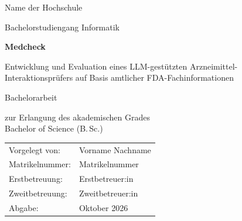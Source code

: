 \documentclass[
  11pt,
  a4paper,
  oneside,
  parskip=half,
  bibliography=totoc,
  listof=totoc,
  numbers=noenddot
]{scrreprt}
\newcommand{\arbeitstitel}{Medcheck}
\newcommand{\arbeitsuntertitel}{Entwicklung und Evaluation eines LLM-gestützten Arzneimittel-Interaktionsprüfers auf Basis amtlicher FDA-Fachinformationen}
\newcommand{\autor}{Vorname Nachname}
\newcommand{\matrikel}{Matrikelnummer}
\newcommand{\hochschule}{Name der Hochschule}
\newcommand{\studiengang}{Bachelorstudiengang Informatik}
\newcommand{\erstbetreuer}{Erstbetreuer:in}
\newcommand{\zweitbetreuer}{Zweitbetreuer:in}
\newcommand{\abgabedatum}{Oktober 2026}
\begin{document}
\begin{titlepage}
  \centering
  {\large \hochschule\par}
  \vspace{0.4em}
  {\normalsize \studiengang\par}
  \vspace{4.5cm}
  {\sffamily\bfseries\Huge \arbeitstitel\par}
  \vspace{1em}
  {\sffamily\Large \arbeitsuntertitel\par}
  \vspace{2.5cm}
  {\large Bachelorarbeit\par}
  \vspace{0.6em}
  {\normalsize zur Erlangung des akademischen Grades\\ Bachelor of Science (B.\,Sc.)\par}
  \vfill
  \begin{tabular}{@{}ll@{}}
    Vorgelegt von: & \autor \\
    Matrikelnummer: & \matrikel \\
    Erstbetreuung: & \erstbetreuer \\
    Zweitbetreuung: & \zweitbetreuer \\
    Abgabe: & \abgabedatum
  \end{tabular}
\end{titlepage}



\tableofcontents

\clearpage
{}








\printbibliography[heading=bibintoc, title={Literaturverzeichnis}]

\end{document}
